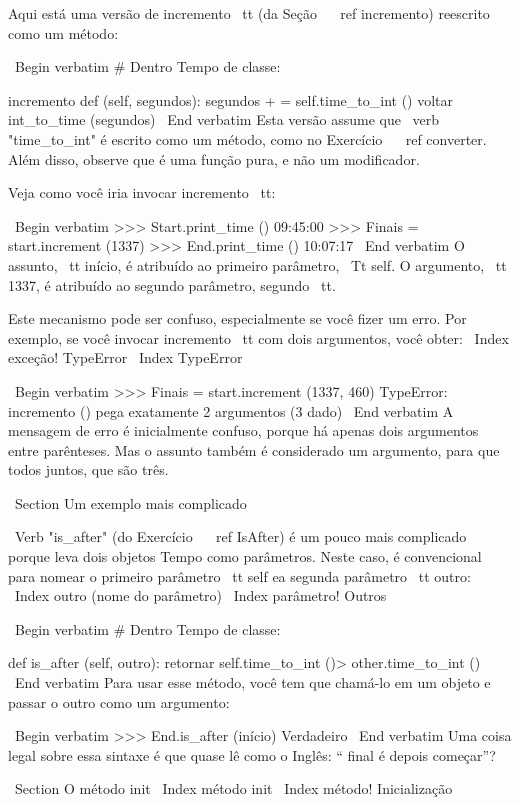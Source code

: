 \documentclass[10pt]{book}
\begin{document}
\begin {itemize}
{{{{{{{{{{{{{{Aqui está uma versão de incremento {\ tt} (da Seção ~ \ ref {incremento})
reescrito como um método:

\ Begin {verbatim}
# Dentro Tempo de classe:

    incremento def (self, segundos):
        segundos + = self.time_to_int ()
        voltar int_to_time (segundos)
\ End {verbatim}
%
Esta versão assume que \ verb "time_to_int" é escrito
como um método, como no Exercício ~ \ ref {} converter. Além disso, observe que
é uma função pura, e não um modificador.

Veja como você iria invocar {incremento \ tt}:

\ Begin {verbatim}
>>> Start.print_time ()
09:45:00
>>> Finais = start.increment (1337)
>>> End.print_time ()
10:07:17
\ End {verbatim}
%
O assunto, {\ tt início}, é atribuído ao primeiro parâmetro,
{\ Tt self}. O argumento, {\ tt 1337}, é atribuído ao
segundo parâmetro, segundo {\ tt}.

Este mecanismo pode ser confuso, especialmente se você fizer um erro.
Por exemplo, se você invocar {incremento \ tt} com dois argumentos, você
obter:
\ Index {exceção! TypeError}
\ Index {} TypeError

\ Begin {verbatim}
>>> Finais = start.increment (1337, 460)
TypeError: incremento () pega exatamente 2 argumentos (3 dado)
\ End {verbatim}
%
A mensagem de erro é inicialmente confuso, porque há
apenas dois argumentos entre parênteses. Mas o assunto também é
considerado um argumento, para que todos juntos, que são três.


\ Section {Um exemplo mais complicado}

\ Verb "is_after" (do Exercício ~ \ ref {IsAfter}) é um pouco mais complicado
porque leva dois objetos Tempo como parâmetros. Neste caso, é
convencional para nomear o primeiro parâmetro {\ tt self} ea segunda
parâmetro {\ tt outro}:
\ Index {outro (nome do parâmetro)}
\ Index {parâmetro! Outros}

\ Begin {verbatim}
# Dentro Tempo de classe:

    def is_after (self, outro):
        retornar self.time_to_int ()> other.time_to_int ()
\ End {verbatim}
%
Para usar esse método, você tem que chamá-lo em um objeto e passar
o outro como um argumento:

\ Begin {verbatim}
>>> End.is_after (início)
Verdadeiro
\ End {verbatim}
%
Uma coisa legal sobre essa sintaxe é que quase lê
como o Inglês: `` final é depois começar''?


\ Section {O método init}
\ Index {método init}
\ Index {método! Inicialização}

}}}}}}}}}}}}}}
\end{itemize}
\end{document}
